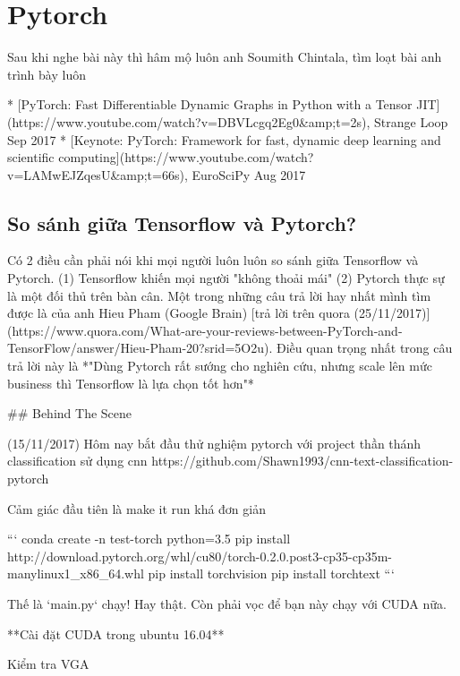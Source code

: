 \chapter{Pytorch}


Sau khi nghe bài này thì hâm mộ luôn anh Soumith Chintala, tìm loạt bài anh trình bày luôn

* [PyTorch: Fast Differentiable Dynamic Graphs in Python with a Tensor JIT](https://www.youtube.com/watch?v=DBVLcgq2Eg0&amp;t=2s), Strange Loop Sep 2017
* [Keynote: PyTorch: Framework for fast, dynamic deep learning and scientific computing](https://www.youtube.com/watch?v=LAMwEJZqesU&amp;t=66s), EuroSciPy Aug 2017


\section{So sánh giữa Tensorflow và Pytorch?}

Có 2 điều cần phải nói khi mọi người luôn luôn so sánh giữa Tensorflow và Pytorch. (1) Tensorflow khiến mọi người "không thoải mái" (2) Pytorch thực sự là một đối thủ trên bàn cân. Một trong những câu trả lời hay nhất mình tìm được là của anh Hieu Pham (Google Brain) [trả lời trên quora (25/11/2017)](https://www.quora.com/What-are-your-reviews-between-PyTorch-and-TensorFlow/answer/Hieu-Pham-20?srid=5O2u). Điều quan trọng nhất trong câu trả lời này là *"Dùng Pytorch rất sướng cho nghiên cứu, nhưng scale lên mức business thì Tensorflow là lựa chọn tốt hơn"*

## Behind The Scene

(15/11/2017) Hôm nay bắt đầu thử nghiệm pytorch với project thần thánh classification sử dụng cnn https://github.com/Shawn1993/cnn-text-classification-pytorch

Cảm giác đầu tiên là make it run khá đơn giản

```
conda create -n test-torch python=3.5
pip install http://download.pytorch.org/whl/cu80/torch-0.2.0.post3-cp35-cp35m-manylinux1_x86_64.whl
pip install torchvision
pip install torchtext
```

Thế là `main.py` chạy! Hay thật. Còn phải vọc để bạn này chạy với CUDA nữa.

**Cài đặt CUDA trong ubuntu 16.04**

Kiểm tra VGA

